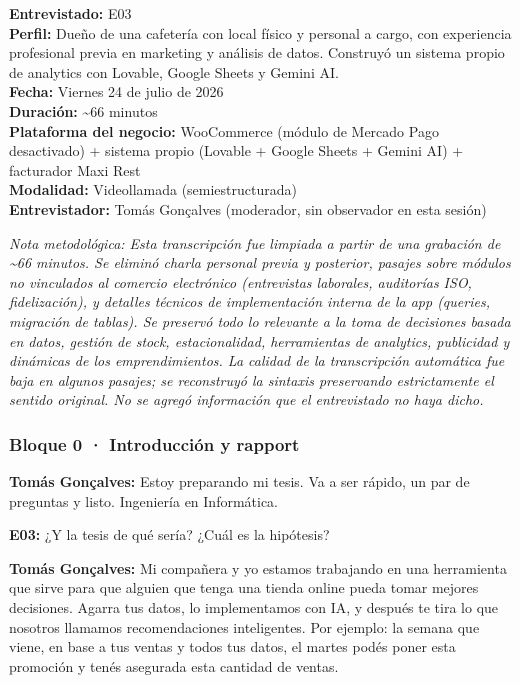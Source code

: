 ﻿
\noindent\textbf{Entrevistado:} E03\\
\noindent\textbf{Perfil:} Dueño de una cafetería con local físico y personal a cargo, con experiencia profesional previa en marketing y análisis de datos. Construyó un sistema propio de analytics con Lovable, Google Sheets y Gemini AI.\\
\noindent\textbf{Fecha:} Viernes 24 de julio de 2026\\
\noindent\textbf{Duración:} \textasciitilde66 minutos\\
\noindent\textbf{Plataforma del negocio:} WooCommerce (módulo de Mercado Pago desactivado) + sistema propio (Lovable + Google Sheets + Gemini AI) + facturador Maxi Rest\\
\noindent\textbf{Modalidad:} Videollamada (semiestructurada)\\
\noindent\textbf{Entrevistador:} Tomás Gonçalves (moderador, sin observador en esta sesión)

\begin{framed}
\small\noindent\textit{Nota metodológica: Esta transcripción fue limpiada a partir de una grabación de \textasciitilde66 minutos. Se eliminó charla personal previa y posterior, pasajes sobre módulos no vinculados al comercio electrónico (entrevistas laborales, auditorías ISO, fidelización), y detalles técnicos de implementación interna de la app (queries, migración de tablas). Se preservó todo lo relevante a la toma de decisiones basada en datos, gestión de stock, estacionalidad, herramientas de analytics, publicidad y dinámicas de los emprendimientos. La calidad de la transcripción automática fue baja en algunos pasajes; se reconstruyó la sintaxis preservando estrictamente el sentido original. No se agregó información que el entrevistado no haya dicho.}
\end{framed}

\subsubsection*{Bloque 0 · Introducción y rapport}

\noindent\textbf{Tomás Gonçalves:} Estoy preparando mi tesis. Va a ser rápido, un par de preguntas y listo. Ingeniería en Informática.

\noindent\textbf{E03:} ¿Y la tesis de qué sería? ¿Cuál es la hipótesis?

\noindent\textbf{Tomás Gonçalves:} Mi compañera y yo estamos trabajando en una herramienta que sirve para que alguien que tenga una tienda online pueda tomar mejores decisiones. Agarra tus datos, lo implementamos con IA, y después te tira lo que nosotros llamamos recomendaciones inteligentes. Por ejemplo: la semana que viene, en base a tus ventas y todos tus datos, el martes podés poner esta promoción y tenés asegurada esta cantidad de ventas.

